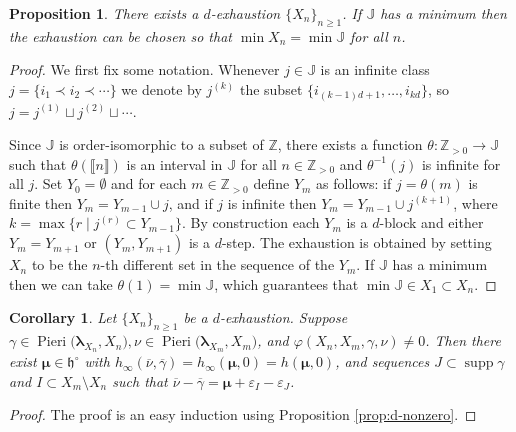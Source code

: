 \documentclass[11pt,fleqn]{amsart}
\newcommand\ZZ{\mathbb Z}
\newcommand\JJ{\mathbb J}
\renewcommand\to{\longrightarrow}
\renewcommand\phi{\varphi}
\renewcommand\epsilon{\varepsilon}
\newtheorem{prop}[thm]{Proposition}
\newtheorem{cor}[thm]{Corollary}
\theoremstyle{definition}
\theoremstyle{remark}
\theoremstyle{remark}
\newcommand\interval[1]{\llbracket{#1}\rrbracket}
\newcommand\lie[1]{\mathfrak{#1}}
\newcommand\wt[1]{\boldsymbol{#1}}
\DeclareMathOperator\supp{supp}
\newcommand\Pieri[2]{\operatorname{Pieri}{(#1},{#2)}}
\newcommand\map[4]{\phi(#3,#4,#1,#2)}
\begin{document}
\begin{prop}
\label{prop:d-exhaustion}
There exists a $d$-exhaustion $\{X_n\}_{n \geq 1}$. If $\JJ$ has a minimum then 
the exhaustion can be chosen so that $\min X_n = \min \JJ$ for all $n$. 
\end{prop}
\begin{proof}
We first fix some notation. Whenever $j \in \JJ$ is an infinite class $j = 
\{i_1 \prec i_2 \prec \cdots\}$ we denote by $j^{(k)}$ the subset $\{i_{(k-1)d 
+ 1}, \ldots, i_{kd}\}$, so $j = j^{(1)} \sqcup j^{(2)} \sqcup \cdots$.

Since $\JJ$ is order-isomorphic to a subset of $\ZZ$, there exists a function
$\theta: \ZZ_{>0} \to \JJ$ such that $\theta(\interval{n})$ is an interval in 
$\JJ$ for all $n \in \ZZ_{>0}$ and $\theta^{-1}(j)$ is infinite for all $j$. 
Set $Y_0 = \emptyset$ and for each $m \in \ZZ_{>0}$ define $Y_{m}$ as 
follows: if $j = \theta(m)$ is finite then $Y_m = Y_{m-1} \cup j$, and if $j$ 
is infinite then $Y_m = Y_{m-1} \cup j^{(k+1)}$, where $k = \max \{ r \mid 
j^{(r)} \subset Y_{m-1} \}$. By construction each $Y_m$ is a $d$-block and  
either $Y_m = Y_{m+1}$ or $(Y_m,Y_{m+1})$ is a $d$-step. The exhaustion is 
obtained by setting $X_n$ to be the $n$-th different set in the sequence of the 
$Y_m$. If $\JJ$ has a minimum then we can take $\theta(1) = \min \JJ$, which 
guarantees that $\min \JJ \in X_1 \subset X_n$. 
\end{proof}

\begin{cor}
\label{cor:d-nonzero-maps}
Let $\{X_n\}_{n \geq 1}$ be a $d$-exhaustion. Suppose $\gamma \in 
\Pieri{\wt\lambda_{X_n}}{X_n}, \nu \in \Pieri{\wt\lambda_{X_m}}{X_m}$, and 
$\map{\gamma}{\nu}{X_n}{X_m} \neq 0$. Then there exist $\wt\mu \in \lie 
h^\circ$ with $h_\infty(\overline\nu,\overline\gamma) = h_\infty(\wt\mu,0) 
= h(\wt\mu,0)$,
and sequences $J \subset \supp \gamma$ and $I \subset X_m \setminus X_n$ such 
that $\overline \nu - \overline \gamma = \wt\mu + \epsilon_I - \epsilon_J$.
\end{cor}
\begin{proof}
The proof is an easy induction using Proposition \ref{prop:d-nonzero}.
\end{proof}
\end{document}

